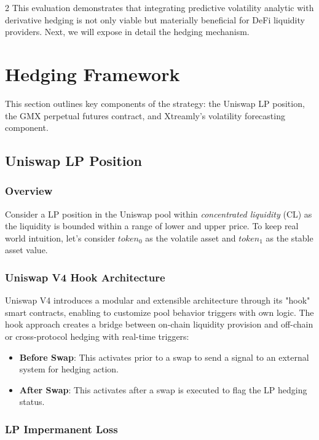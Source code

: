 \documentclass[10pt]{article}
\begin{document}
\begin{multicols}{2}
\smallskip
This evaluation demonstrates that integrating predictive volatility analytic with derivative hedging is not only viable but materially beneficial for DeFi liquidity providers. Next, we will expose in detail the hedging mechanism.

\newpage
\section{Hedging Framework}
\label{sec:hedging}

This section outlines key components of the strategy: the Uniswap LP position, the GMX perpetual futures contract, and Xtreamly’s volatility forecasting component.

\subsection{Uniswap LP Position}
\label{sec:uniswaplp}

\subsubsection{Overview}
Consider a LP position in the Uniswap pool within \textit{concentrated liquidity} (CL) as the liquidity is bounded within a range of lower and upper price. To keep real world intuition, let's consider $token_0$ as the volatile asset and $token_1$ as the stable asset value.

\subsubsection{Uniswap V4 Hook Architecture}
Uniswap V4 introduces a modular and extensible architecture through its "hook" smart contracts, enabling to customize pool behavior triggers with own logic. The hook approach creates a bridge between on-chain liquidity provision and off-chain or cross-protocol hedging with real-time triggers:

\begin{itemize}
    \item \textbf{Before Swap}: This activates prior to a swap to send a signal to an external system for hedging action.	
	\item \textbf{After Swap}: This activates after a swap is executed to flag the LP hedging status.
\end{itemize}

\subsubsection{LP Impermanent Loss}


\end{multicols}
\end{document}
